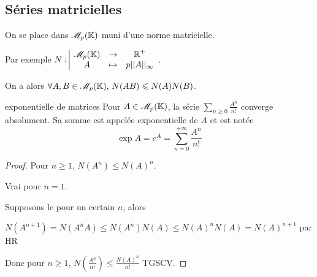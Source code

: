 \subsection{Séries matricielles }

On se place dans $\mathscr M_p(\mathbb{K})$ muni d'une norme matricielle. 

Par exemple $N: \space \begin{array}{|ccc} \displaystyle \mathscr M_p(\mathbb{K}) & \to & \displaystyle \mathbb{R}^+ \\ \displaystyle A & \mapsto & \displaystyle p ||A||_\infty \end{array}$. 

On a alors $\forall A, B \in \mathscr M_p(\mathbb{K}), \, N(AB) \leqslant N(A) N(B)$.

\begin{theoreme}{exponentielle de matrices}{}
    Pour $A \in \mathscr M_p(\mathbb{K})$, la série $\sum_{n \geqslant 0} \frac{A^n}{n!}$ converge absolument. 
    Sa somme est appelée exponentielle de $A$ et est notée 
    $$\displaystyle \operatorname{exp} A = e^A = \sum_{n = 0}^{+\infty} \frac{A^n}{n!}$$
\end{theoreme}


\begin{proof}
    Pour $n \geqslant 1$, $N(A^n) \leqslant N(A)^n$.

    Vrai pour $n = 1$. 

    Supposons le pour un certain $n$, alors 

    $N(A^{n + 1}) = N(A^n A) \leqslant N(A^n) N(A) \leqslant N(A)^n N(A) = N(A)^{n + 1}$
    par HR 

    Donc pour $n \geqslant 1$, $N\left( \frac{A^n}{n!} \right) \leqslant \frac{N(A)^n}{n!}$ TGSCV. 
\end{proof}

